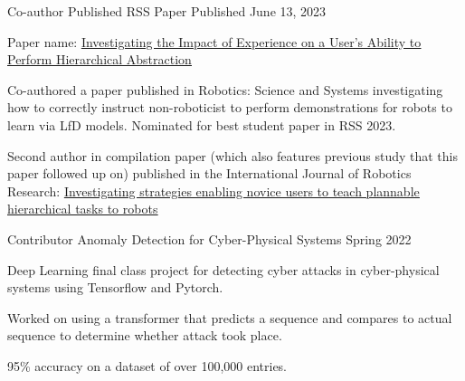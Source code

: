 
\begin{cventries}

  \cventry
      {Co-author} %
      {Published RSS Paper} %
      {} %
      {Published June 13, 2023} %
      {
        \begin{cvitems} %
          \item Paper name: \textcolor{awesome}{\underline{\href{https://openreview.net/forum?id=kXy0HAnah0-}{Investigating the Impact of Experience on a User's Ability to Perform Hierarchical Abstraction}}}
          \item Co-authored a paper published in Robotics: Science and Systems investigating how to correctly instruct non-roboticist to perform demonstrations for robots to learn via LfD models. Nominated for best student paper in RSS 2023.
          \item Second author in compilation paper (which also features previous study that this paper followed up on) published in the International Journal of Robotics Research: {\underline{\href{https://journals.sagepub.com/doi/10.1177/02783649241301075?icid=int.sj-abstract.citing-articles.1}{Investigating strategies enabling novice users to teach plannable hierarchical tasks to robots}}}
        \end{cvitems}
      }

  \cventry
      {Contributor} %
      {Anomaly Detection for Cyber-Physical Systems} %
      {} %
      {Spring 2022} %
      {
        \begin{cvitems} %
          \item {Deep Learning final class project for detecting cyber attacks in cyber-physical systems using Tensorflow and Pytorch.}
          \item {Worked on using a transformer that predicts a sequence and compares to actual sequence to determine whether attack took place.}
          \item {95\% accuracy on a dataset of over 100,000 entries.}
        \end{cvitems}
      }


\end{cventries}